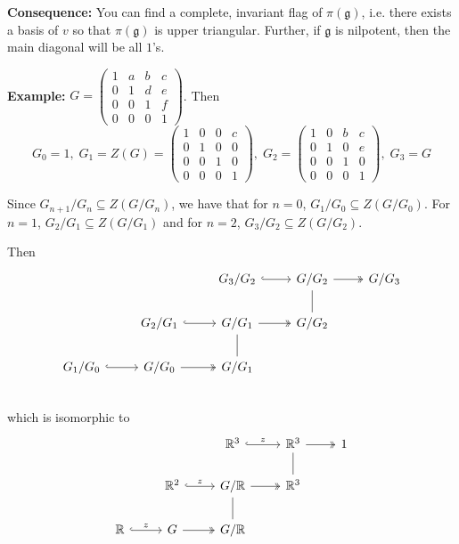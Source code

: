 \documentclass[12pt]{article}
\newcommand{\R}{\mathbb{R}}
\newcommand{\C}{\mathbb{C}}
\newcommand{\g}{\mathfrak{g}}
\newcommand{\glf}{\mathfrak{gl}}
\newenvironment*{tbox}[2][gray]{
    \begin{tcolorbox}[
        parbox=false,
        colback=#1!5!white,
        colframe=#1!75!black,
        breakable,
        title={#2}
    ]}
    {\end{tcolorbox}}
\begin{document}
    \begin{tbox}{\textbf{Theorem (of Lie):} Let $\g$ be a solvable lie algebra and let $\pi: \g \to \glf(v)$ (as a lie algebra $\glf(v)$ is given by $[A, B] = AB - BA$ though $V$ does not have a lie algebra structure). Further, assume for $x \in \g$, the eigenvalues of $\pi(x)$ are real (alternatively, extend everything to $\C$ so we can solve characteristic polynomials). Then, there exists a $v \neq 0$ so that $v$ is an eigenvector of $\pi(\g)$}
        \textbf{Consequence:} You can find a complete, invariant flag of $\pi(\g)$, i.e. there exists a basis of $v$ so that $\pi(\g)$ is upper triangular. Further, if $\g$ is nilpotent, then the main diagonal will be all $1$'s. 
    \end{tbox}

    \textbf{Example:} $G = \begin{pmatrix}
        1 & a & b & c\\ 
        0 & 1 & d & e\\
        0 & 0 & 1 & f\\
        0 & 0 & 0 & 1
    \end{pmatrix}$. Then 
    \[G_0 = 1,\; G_1 = Z(G) = \begin{pmatrix}
        1 & 0 & 0 & c\\ 
        0 & 1 & 0 & 0\\ 
        0 & 0 & 1 & 0\\ 
        0 & 0 & 0 & 1
    \end{pmatrix},\; G_2 = \begin{pmatrix}
        1 & 0 & b & c\\ 
        0 & 1 & 0 & e\\ 
        0 & 0 & 1 & 0\\ 
        0 & 0 & 0 & 1
    \end{pmatrix},\; G_3 = G\]

    Since $G_{n+1}/G_n \subseteq Z(G/G_n)$, we have that for $n=0$, $G_1/G_0 \subseteq Z(G/G_0)$. For $n=1$, $G_2/G_1 \subseteq Z(G/G_1)$ and for $n=2$, $G_3/G_2 \subseteq Z(G/G_2)$.

    Then 
    \[\begin{tikzcd}
        & & G_3/G_2 \arrow[hook]{r} & G/G_2 \arrow[two heads]{r} & G/G_3\\
        & G_2/G_1 \arrow[hook]{r} & G/G_1 \arrow[two heads]{r} & G/G_2 \arrow[no head]{u}\\
        G_1/G_0 \arrow[hook]{r} & G/G_0 \arrow[two heads]{r} & G/G_1 \arrow[no head]{u}\\
    \end{tikzcd}\]
    which is isomorphic to 
    \[\begin{tikzcd}
        & & \R^3 \arrow[hook]{r}{z} & \R^3 \arrow[two heads]{r} & 1\\
        & \R^2 \arrow[hook]{r}{z} & G/\R \arrow[two heads]{r} & \R^3 \arrow[no head]{u}\\
        \R \arrow[hook]{r}{z} & G \arrow[two heads]{r} & G/\R \arrow[no head]{u}\\
    \end{tikzcd}\]
\end{document}

